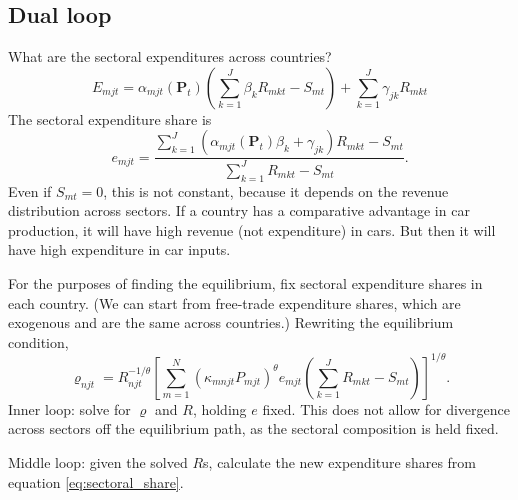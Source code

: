 \documentclass[12pt]{article}
\begin{document}
\subsection{Dual loop}
What are the sectoral expenditures across countries?
\[
E_{mjt} = 			\alpha_{mjt}(\mathbf P_t)
			\left(
				\sum_{k=1}^J\beta_k R_{mkt} - S_{mt}
			\right)
			+ \sum_{k=1}^J\gamma_{jk}R_{mkt}
\]
The sectoral expenditure share is
\begin{equation}\label{eq:sectoral_share}
e_{mjt} = \frac
	{\sum_{k=1}^J(\alpha_{mjt}(\mathbf P_t)\beta_k+\gamma_{jk}) R_{mkt} - S_{mt}}
	{\sum_{k=1}^J R_{mkt}-S_{mt}}.
\end{equation}
Even if $S_{mt}=0$, this is not constant, because it depends on the revenue distribution across sectors. If a country has a comparative advantage in car production, it will have high revenue (not expenditure) in cars. But then it will have high expenditure in car inputs. 

For the purposes of finding the equilibrium, fix sectoral expenditure shares in each country. (We can start from free-trade expenditure shares, which are exogenous and are the same across countries.) Rewriting the equilibrium condition,
\[
	\varrho_{njt} = R_{njt}^{-1/\theta}
	\left[
	\sum_{m=1}^N
		(\kappa_{mnjt} P_{mjt})^{\theta}
		e_{mjt}
		\left(
			\sum_{k=1}^J R_{mkt}
			-S_{mt}
		\right)
	\right]^{1/\theta}.
\]
Inner loop: solve for $\varrho$ and $R$, holding $e$ fixed. This does not allow for divergence across sectors off the equilibrium path, as the sectoral composition is held fixed.

Middle loop: given the solved $R$s, calculate the new expenditure shares from equation \eqref{eq:sectoral_share}. 
\end{document}
